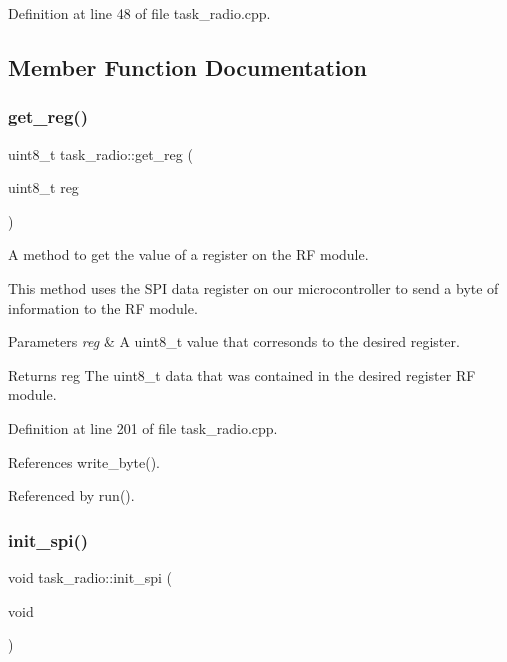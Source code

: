 Definition at line 48 of file task\+\_\+radio.\+cpp.



\subsection{Member Function Documentation}
\mbox{\label{classtask__radio_a864714d4a62ca47b6852272d70aa0a0e}} 
\subsubsection{\texorpdfstring{get\+\_\+reg()}{get\_reg()}}
{\footnotesize\ttfamily uint8\+\_\+t task\+\_\+radio\+::get\+\_\+reg (\begin{DoxyParamCaption}\item[{uint8\+\_\+t}]{reg }\end{DoxyParamCaption})\hspace{0.3cm}{\ttfamily [protected]}}



A method to get the value of a register on the RF module. 

This method uses the S\+PI data register on our microcontroller to send a byte of information to the RF module. 
\begin{DoxyParams}{Parameters}
{\em reg} & A uint8\+\_\+t value that corresonds to the desired register. \\
\hline
\end{DoxyParams}
\begin{DoxyReturn}{Returns}
reg The uint8\+\_\+t data that was contained in the desired register RF module. 
\end{DoxyReturn}


Definition at line 201 of file task\+\_\+radio.\+cpp.



References write\+\_\+byte().



Referenced by run().

\mbox{\label{classtask__radio_ae65a87dacc155acdc221ca640a6812f8}} 
\subsubsection{\texorpdfstring{init\+\_\+spi()}{init\_spi()}}
{\footnotesize\ttfamily void task\+\_\+radio\+::init\+\_\+spi (\begin{DoxyParamCaption}\item[{void}]{ }\end{DoxyParamCaption})\hspace{0.3cm}{\ttfamily [protected]}}



